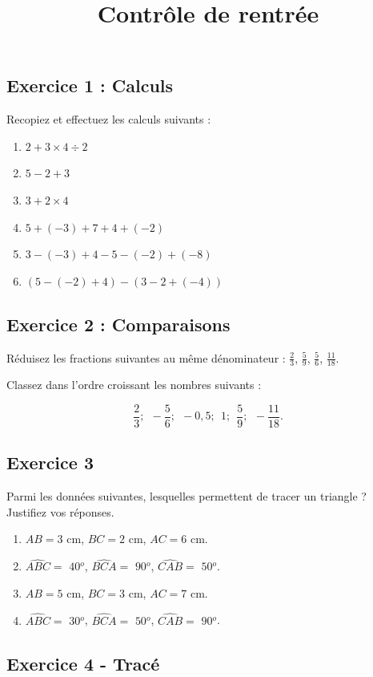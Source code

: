 \documentclass[14pt]{extreport}
\title{Contrôle de rentrée}
\date{}
\newcommand\ang[1]{$#1{}^o$}
\theoremstyle{plain}
\begin{document}
\subsection*{Exercice 1 : Calculs}  %
Recopiez et effectuez les calculs suivants : 

\begin{enumerate}
\item $2+3\times4\div2$
\item $5 - 2 + 3$
\item $ 3+2\times 4$
\item $ 5 + (-3) + 7 +  4 +  (-2) $
\item $ 3 - (-3) + 4 - 5 - (-2) + (-8)$
\item $(5-(-2) + 4) - (3- 2 + (-4))$
\end{enumerate}

\subsection*{Exercice 2 : Comparaisons}

Réduisez les fractions suivantes au même dénominateur : $\frac23$, $\frac59$, $\frac56$, $\frac{11}{18}$. 

Classez dans l'ordre croissant les nombres suivants : 

\[ \frac23; \ \  -\frac56;\ \   -0,5 ;\ \   1 ;\ \   \frac59 ;\ \   -\frac{11}{18}.\]

\subsection*{Exercice 3}

Parmi les données suivantes, lesquelles permettent de tracer un triangle ? Justifiez vos réponses. 

\begin{enumerate}
\item $AB = 3$ cm, $BC = 2$ cm, $AC = 6$ cm. 
\item $\widehat{ABC} =$ \ang{40}, $\widehat{BCA} =$ \ang{90}, $\widehat{CAB} =$ \ang{50}.
\item $AB = 5$ cm, $BC = 3$ cm, $AC = 7$ cm.
\item $\widehat{ABC} =$ \ang{30}, $\widehat{BCA} =$ \ang{50}, $\widehat{CAB} =$ \ang{90}.
\end{enumerate}

\subsection*{Exercice 4 - Tracé}
\end{document}
